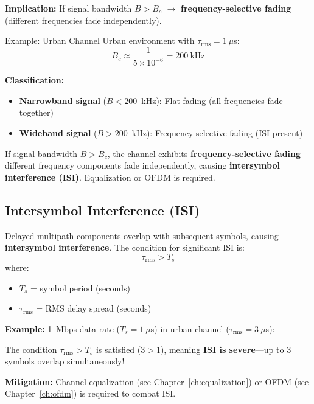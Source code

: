 \textbf{Implication:} If signal bandwidth $B > B_c$ $\rightarrow$ \textbf{frequency-selective fading} (different frequencies fade independently).

\begin{calloutbox}{Example: Urban Channel}
Urban environment with $\tau_{\text{rms}} = 1~\mu$s:
\begin{equation*}
B_c \approx \frac{1}{5 \times 10^{-6}} = 200~\text{kHz}
\end{equation*}

\textbf{Classification:}
\begin{itemize}
\item \textbf{Narrowband signal} ($B < 200$~kHz): Flat fading (all frequencies fade together)
\item \textbf{Wideband signal} ($B > 200$~kHz): Frequency-selective fading (ISI present)
\end{itemize}
\end{calloutbox}

\begin{warningbox}
If signal bandwidth $B > B_c$, the channel exhibits \textbf{frequency-selective fading}---different frequency components fade independently, causing \textbf{intersymbol interference (ISI)}. Equalization or OFDM is required.
\end{warningbox}

\subsection{Intersymbol Interference (ISI)}

Delayed multipath components overlap with subsequent symbols, causing \textbf{intersymbol interference}. The condition for significant ISI is:
\begin{equation}
\tau_{\text{rms}} > T_s
\end{equation}
where:
\begin{itemize}
\item $T_s$ = symbol period (seconds)
\item $\tau_{\text{rms}}$ = RMS delay spread (seconds)
\end{itemize}

\textbf{Example:} 1~Mbps data rate ($T_s = 1~\mu$s) in urban channel ($\tau_{\text{rms}} = 3~\mu$s):

The condition $\tau_{\text{rms}} > T_s$ is satisfied ($3 > 1$), meaning \textbf{ISI is severe}---up to 3 symbols overlap simultaneously!

\textbf{Mitigation:} Channel equalization (see Chapter~\ref{ch:equalization}) or OFDM (see Chapter~\ref{ch:ofdm}) is required to combat ISI.

